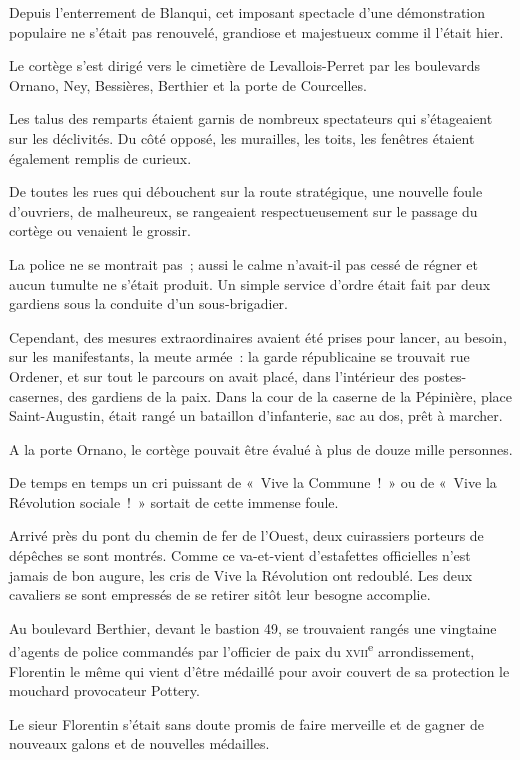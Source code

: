 \documentclass[french,twoside]{book} %
\newenvironment{quoteblock}%
  {\begin{quoting}}
  {\end{quoting}}
\newenvironment{quotebar}{%
    \def\FrameCommand{{\color{rubric!10!}\vrule width 0.5em} \hspace{0.9em}}%
    \def\OuterFrameSep{\itemsep} %
    \MakeFramed {\advance\hsize-\width \FrameRestore}
  }%
  {%
    \endMakeFramed
  }
\renewenvironment{quoteblock}%
  {%
    \savenotes
    \setstretch{0.9}
    \normalfont
    \begin{quotebar}
  }
  {%
    \end{quotebar}
    \spewnotes
  }
\begin{document}
\begin{quoteblock}
 \noindent Depuis l’enterrement de Blanqui, cet imposant spectacle d’une démonstration populaire ne s’était pas renouvelé, grandiose et majestueux comme il l’était hier.\par
 Le cortège s’est dirigé vers le cimetière de Levallois-Perret par les boulevards Ornano, Ney, Bessières, Berthier et la porte de Courcelles.\par
 Les talus des remparts étaient garnis de nombreux spectateurs qui s’étageaient sur les déclivités. Du côté opposé, les murailles, les toits, les fenêtres étaient également remplis de curieux.\par
 De toutes les rues qui débouchent sur la route stratégique, une nouvelle foule d’ouvriers, de malheureux, se rangeaient respectueusement sur le passage du cortège ou venaient le grossir.\par
 La police ne se montrait pas ; aussi le calme n’avait-il pas cessé de régner et aucun tumulte ne s’était produit. Un simple service d’ordre était fait par deux gardiens sous la conduite d’un sous-brigadier.\par
 Cependant, des mesures extraordinaires avaient été prises pour lancer, au besoin, sur les manifestants, la meute armée : la garde républicaine se trouvait rue Ordener, et sur tout le parcours on avait placé, dans l’intérieur des postes-casernes, des gardiens de la paix. Dans la cour de la caserne de la Pépinière,  place Saint-Augustin, était rangé un bataillon d’infanterie, sac au dos, prêt à marcher.\par
 A la porte Ornano, le cortège pouvait être évalué à plus de douze mille personnes.\par
 De temps en temps un cri puissant de « Vive la Commune ! » ou de « Vive la Révolution sociale ! » sortait de cette immense foule.\par
 Arrivé près du pont du chemin de fer de l’Ouest, deux cuirassiers porteurs de dépêches se sont montrés. Comme ce va-et-vient d’estafettes officielles n’est jamais de bon augure, les cris de Vive la Révolution ont redoublé. Les deux cavaliers se sont empressés de se retirer sitôt leur besogne accomplie.\par
 Au boulevard Berthier, devant le bastion 49, se trouvaient rangés une vingtaine d’agents de police commandés par l’officier de paix du {\scshape xvii}\textsuperscript{e} arrondissement, Florentin le même qui vient d’être médaillé pour avoir couvert de sa protection le mouchard provocateur Pottery.\par
 Le sieur Florentin s’était sans doute promis de faire merveille et de gagner de nouveaux galons et de nouvelles médailles.\par

\end{quoteblock}
\end{document}
